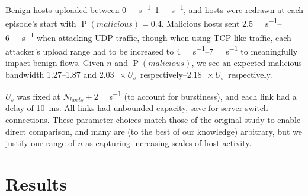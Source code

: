 \documentclass[10pt, times, comsoc]{IEEEtran}
\begin{document}
Benign hosts uploaded between \SIrange{0}{1}{\mega\bit\per\second}, and hosts were redrawn at each episode's start with $\operatorname{P}(\mathit{malicious})=0.4$.
Malicious hosts sent \SIrange{2.5}{6}{\mega\bit\per\second} when attacking UDP traffic, though when using TCP-like traffic, each attacker's upload range had to be increased to \SIrange{4}{7}{\mega\bit\per\second} to meaningfully impact benign flows.
Given $n$ and $\operatorname{P}(\mathit{malicious})$, we see an expected malicious bandwidth \numrange{1.27}{1.87} and \SIrange{2.03}{2.18}{$\! \times U_s$} respectively.

$U_s$ was fixed at $N_{\mathit{hosts}}+2$ \si{\mega\bit\per\second} (to account for burstiness), and each link had a delay of \SI{10}{\milli\second}.
All links had unbounded capacity, save for server-switch connections.
These parameter choices match those of the original study to enable direct comparison, and many are (to the best of our knowledge) arbitrary, but we justify our range of $n$ as capturing increasing scales of host activity.

\section{Results}
\label{sec:the-results-of-doing-so}
\end{document}
